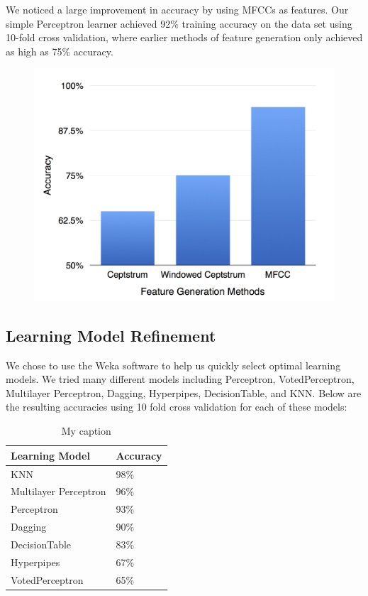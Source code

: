 \documentclass{article}
\begin{document}
We noticed a large improvement in accuracy by using MFCCs as features. Our simple Perceptron learner achieved 92\% training accuracy on the data set using 10-fold cross validation, where earlier methods of feature generation only achieved as high as 75\% accuracy.

\begin{figure}[h]
\includegraphics[width=\linewidth]{feature_generation_methods}
\end{figure}


\subsection{Learning Model Refinement}

We chose to use the Weka software to help us quickly select optimal learning models. We tried many different models including Perceptron, VotedPerceptron, Multilayer Perceptron, Dagging, Hyperpipes, DecisionTable, and KNN. Below are the resulting accuracies using 10 fold cross validation for each of these models:

\begin{table}[]
\centering
\caption{My caption}
\label{my-label}
\begin{tabular}{|l|l|}
\hline
Learning Model        & Accuracy \\ \hline
KNN                   & 98\%     \\ \hline
Multilayer Perceptron & 96\%     \\ \hline
Perceptron            & 93\%     \\ \hline
Dagging               & 90\%     \\ \hline
DecisionTable         & 83\%     \\ \hline
Hyperpipes            & 67\%     \\ \hline
VotedPerceptron       & 65\%     \\ \hline
\end{tabular}
\end{table}
\end{document}
